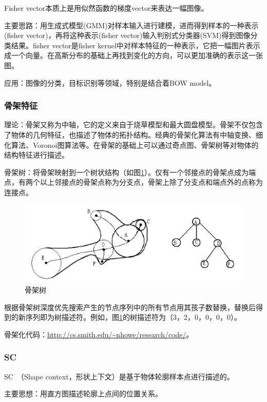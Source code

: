 \documentclass[12pt]{article}
\begin{document}
Fisher vector本质上是用似然函数的梯度vector来表达一幅图像。

{\color{blue}主要思路}：用生成式模型(GMM)对样本输入进行建模，进而得到样本的一种表示(fisher vector)，再将这种表示(fisher vector)输入判别式分类器(SVM)得到图像分类结果。fisher vector是fisher kernel中对样本特征的一种表示，它把一幅图片表示成一个向量。在高斯分布的基础上再找到变化的方向，可以更加准确的表示这一张图。

{\color{blue}应用}：图像的分类，目标识别等领域，特别是结合着BOW model。

\subsubsection{骨架特征}

理论：骨架又称为中轴，它的定义来自于烧草模型和最大圆盘模型。骨架不仅包含了物体的几何特征，也描述了物体的拓扑结构。经典的骨架化算法有中轴变换、细化算法、Voronoi图算法等。在骨架的基础上可以通过奇点图、骨架树等对物体的结构特征进行描述。

骨架树：将骨架映射到一个树状结构（如图\ref{fig:tree}）。仅有一个邻接点的骨架点成为端点，有两个以上邻接点的骨架点称为分支点，骨架上除了分支点和端点外的点称为连接点。
        \begin{figure}
            \centering
            \includegraphics[width=0.5\linewidth]{tree}
            \caption{骨架树}
            \label{fig:tree}
        \end{figure}
        根据骨架树深度优先搜索产生的节点序列中的所有节点用其孩子数替换，替换后得到的新序列即为树描述符。例如，图\ref{fig:tree}的树描述符为（3，2，0，0，0，0）。

{\color{blue}骨架化代码}：\url{http://cs.smith.edu/~nhowe/research/code/}。

\subsubsection{SC}
    
    SC~\cite{belongie2002shape}（Shape context，形状上下文）是基于物体轮廓样本点进行描述的。
    
    {\color{blue}主要思想}：用直方图描述轮廓上点间的位置关系。
    
\end{document}
